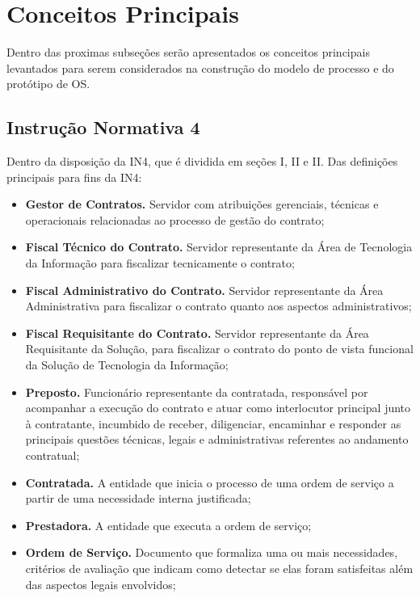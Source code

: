 \section{Conceitos Principais}

Dentro das proximas subseções serão apresentados os conceitos principais
levantados para serem considerados na construção do modelo de processo
e do protótipo de OS.

\subsection{Instrução Normativa 4}

Dentro da disposição da IN4, que é dividida em seções I, II e II.
Das definições principais para fins da IN4:
\begin{itemize}
 fiscal técnico do contrato, fiscal administrativo do contrato, fiscal requisitante do contrato e preposto.
  \item \textbf{Gestor de Contratos.} Servidor com atribuições gerenciais,
  técnicas e operacionais relacionadas ao processo de gestão do contrato;
  \item \textbf{Fiscal Técnico do Contrato.} Servidor representante da Área de
  Tecnologia da Informação para fiscalizar tecnicamente o contrato;
  \item \textbf{Fiscal Administrativo do Contrato.} Servidor representante da
  Área Administrativa para fiscalizar o contrato quanto aos aspectos
  administrativos;
  \item \textbf{Fiscal Requisitante do Contrato.} Servidor representante da
  Área Requisitante da Solução, para fiscalizar o contrato do ponto de vista
  funcional da Solução de Tecnologia da Informação;
  \item \textbf{Preposto.} Funcionário representante da contratada,
  responsável por acompanhar a execução do contrato e atuar como interlocutor
  principal junto à contratante, incumbido de receber, diligenciar, encaminhar
  e responder as principais questões técnicas, legais e administrativas
  referentes ao andamento contratual;
  \item \textbf{Contratada.} A entidade que inicia o processo de uma ordem de
  serviço a partir de uma necessidade interna justificada;
  \item \textbf{Prestadora.} A entidade que executa a ordem de serviço;
  \item \textbf{Ordem de Serviço.} Documento que formaliza uma ou mais
  necessidades, critérios de avaliação que indicam como detectar se elas foram
  satisfeitas além das aspectos legais envolvidos;
\end{itemize}

